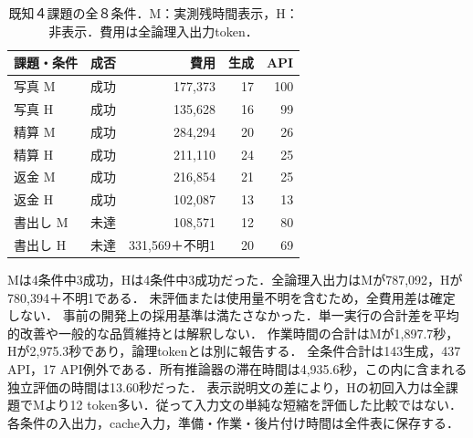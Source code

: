 \begin{table}[tb]
\centering\small\setlength{\tabcolsep}{4pt}
\caption{既知４課題の全８条件．M：実測残時間表示，H：非表示．費用は全論理入出力token．}
\begin{tabular}{llrrr}
課題・条件 & 成否 & 費用 & 生成 & API \\ \hline
写真 M & 成功 & 177,373 & 17 & 100 \\
写真 H & 成功 & 135,628 & 16 & 99 \\
精算 M & 成功 & 284,294 & 20 & 26 \\
精算 H & 成功 & 211,110 & 24 & 25 \\
返金 M & 成功 & 216,854 & 21 & 25 \\
返金 H & 成功 & 102,087 & 13 & 13 \\
書出し M & 未達 & 108,571 & 12 & 80 \\
書出し H & 未達 & 331,569＋不明1 & 20 & 69 \\
\hline
\end{tabular}
\end{table}
Mは4条件中3成功，Hは4条件中3成功だった．全論理入出力はMが787,092，Hが780,394＋不明1である．
未評価または使用量不明を含むため，全費用差は確定しない．
事前の開発上の採用基準は満たさなかった．単一実行の合計差を平均的改善や一般的な品質維持とは解釈しない．
作業時間の合計はMが1,897.7秒，Hが2,975.3秒であり，論理tokenとは別に報告する．
全条件合計は143生成，437 API，17 API例外である．所有推論器の滞在時間は4,935.6秒，この内に含まれる独立評価の時間は13.60秒だった．
表示説明文の差により，Hの初回入力は全課題でMより12 token多い．従って入力文の単純な短縮を評価した比較ではない．各条件の入出力，cache入力，準備・作業・後片付け時間は全件表に保存する．
